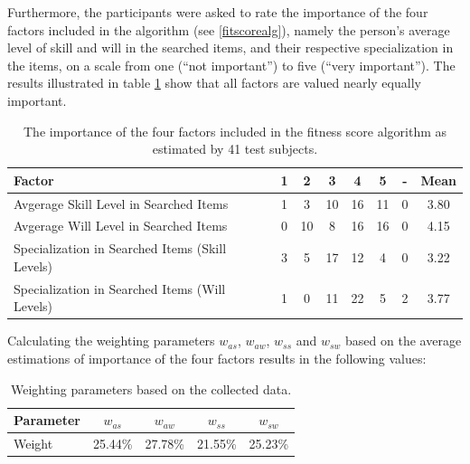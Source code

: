 Furthermore, the participants were asked to rate the importance of the four factors included in the algorithm (see \ref{fitscorealg}), namely the person's average level of skill and will in the searched items, and their respective specialization in the items, on a scale from one (``not important'') to five (``very important''). The results illustrated in table \ref{tab:survey_weight} show that all factors are valued nearly equally important.
\begin{table}[H]
\centering
\begin{tabular}{l||c|c|c|c|c|c||c}
Factor & 1  & 2  & 3  & 4  & 5  & - & Mean \\
\hline
Avgerage Skill Level in Searched Items & 1 & 3 & 10 & 16 & 11 & 0 & 3.80\\
Avgerage Will Level in Searched Items & 0 & 10 & 8 & 16 & 16 & 0 & 4.15\\
Specialization in Searched Items (Skill Levels) & 3 & 5 & 17 & 12 & 4 & 0 & 3.22\\
Specialization in Searched Items (Will Levels) & 1 & 0 & 11 & 22 & 5 & 2 & 3.77\\
\end{tabular}
\caption[Survey: Estimated Importance of Weighting Factors]{The importance of the four factors included in the fitness score algorithm as estimated by 41 test subjects.}
\label{tab:survey_weight}
\end{table}


Calculating the weighting parameters $w_{as}$, $w_{aw}$, $w_{ss}$ and $w_{sw}$ based on the average estimations of importance of the four factors results in the following values:
\begin{table}[H]
\centering
\begin{tabular}{l||c|c|c|c}
Parameter & $w_{as}$ & $w_{aw}$ & $w_{ss}$ & $w_{sw}$\\
\hline
Weight & 25.44\% & 27.78\% & 21.55\% & 25.23\% \\
\end{tabular}
\caption[Survey: Resulting Weighting Parameters]{Weighting parameters based on the collected data.}
\end{table}

\newpage

